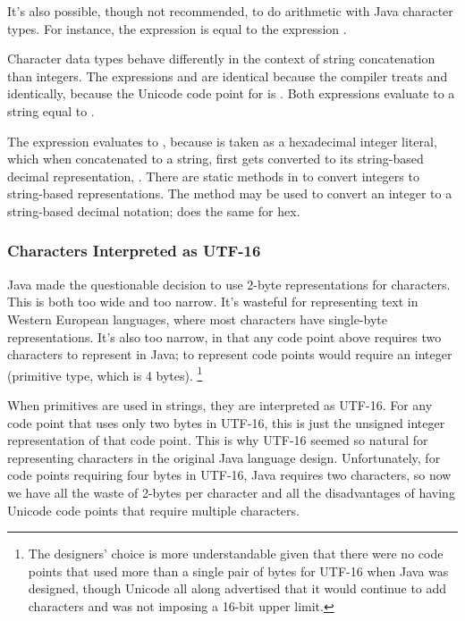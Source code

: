 It's also possible, though not recommended, to do arithmetic with Java
character types.  For instance, the expression  is equal
to the expression .

Character data types behave differently in the context of string
concatenation than integers.  The expressions  and
 are identical because the compiler treats
 and  identically, because the Unicode
code point for  is .  Both expressions
evaluate to a string equal to .  

The expression  evaluates to ,
because  is taken as a hexadecimal integer literal, which
when concatenated to a string, first gets converted to its
string-based decimal representation, .  There are static methods in
 to convert integers to string-based
representations.  The method  may be used
to convert an integer to a string-based decimal notation;
 does the same for hex.

\subsubsection{Characters Interpreted as UTF-16}

Java made the questionable decision to use 2-byte representations for
characters.  This is both too wide and too narrow.  It's wasteful for
representing text in Western European languages, where most characters
have single-byte representations.  It's also too narrow, in that
any code point above  requires two characters to
represent in Java; to represent code points would require an
integer (primitive  type, which is 4 bytes).
%
\footnote{The designers' choice is more understandable given that there were no
code points that used more than a single pair of bytes for UTF-16 when
Java was designed, though Unicode all along advertised that it would
continue to add characters and was not imposing a 16-bit upper limit.}

When  primitives are used in strings, they are interpreted
as UTF-16.  For any code point that uses only two bytes in UTF-16,
this is just the unsigned integer representation of that code point.
This is why UTF-16 seemed so natural for representing characters in
the original Java language design.  Unfortunately, for code points
requiring four bytes in UTF-16, Java requires two characters, so now
we have all the waste of 2-bytes per character and all the
disadvantages of having Unicode code points that require multiple
characters.



